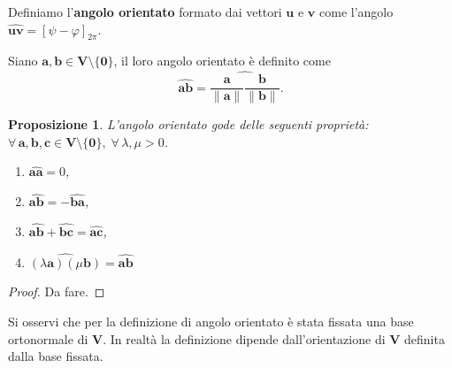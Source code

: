 \documentclass{article}
\theoremstyle{plain}
\newtheorem{prop}[thm]{Proposizione}
\theoremstyle{definition}
\theoremstyle{remark}
\begin{document}
\vspace{10pt}

Definiamo l'\textbf{angolo orientato} formato dai vettori $\mathbf{u}$ e $\mathbf{v}$ come l'angolo 
$\widehat{\mathbf{uv}}=[\psi - \varphi]_{2\pi}$.

\vspace{10pt}

Siano $\mathbf{a}, \mathbf{b} \in \mathbf{V}\setminus\{\mathbf{0}\}$, il loro angolo orientato è definito come
\[\widehat{\mathbf{ab}} = \widehat{\dfrac{\mathbf{a}}{\|\mathbf{a}\|} \dfrac{\mathbf{b}}{\|\mathbf{b}\|}}.\]

\vspace{10pt}

\begin{bxthm}
\begin{prop}
L'angolo orientato gode delle seguenti proprietà:
$\forall\,\mathbf{a},\mathbf{b},\mathbf{c}\in\mathbf{V}\setminus\{\mathbf{0}\},\;\forall\,\lambda,\mu > 0$. 
\begin{enumerate}
\item[a)] $\widehat{\mathbf{aa}} = 0$,
\item[b)] $\widehat{\mathbf{ab}} = -\widehat{\mathbf{ba}}$,
\item[c)] $\widehat{\mathbf{ab}} + \widehat{\mathbf{bc}} = \widehat{\mathbf{ac}}$,
\item[d)] $\widehat{(\lambda\mathbf{a})(\mu\mathbf{b})} = \widehat{\mathbf{ab}}$
\end{enumerate}    
\end{prop}
\end{bxthm}
\begin{proof}
    Da fare.
\end{proof}

\vspace{10pt}

Si osservi che per la definizione di angolo orientato è stata fissata una base ortonormale di $\mathbf{V}$. 
In realtà la definizione dipende dall'orientazione di $\mathbf{V}$ definita dalla base fissata.

\vspace{10pt}
\end{document}
